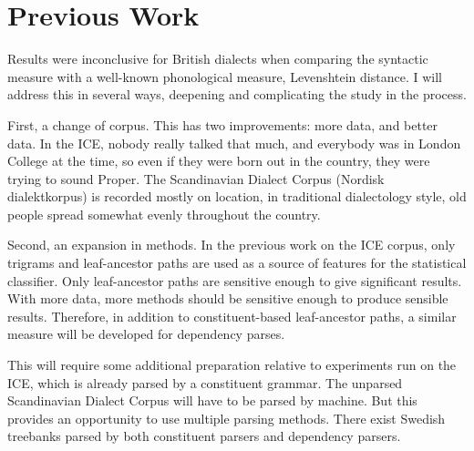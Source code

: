 \documentclass[11pt]{article}
\begin{document}
\section{Previous Work}

Results were inconclusive for British dialects when comparing the
syntactic measure with a well-known phonological measure, Levenshtein
distance. I will address this in several ways, deepening and
complicating the study in the process.

First, a change of corpus. This
has two improvements: more data, and better data. In the ICE, nobody
really talked that much, and everybody was in London College at the
time, so even if they were born out in the country, they were trying
to sound Proper. The Scandinavian Dialect Corpus
(Nordisk dialektkorpus) is recorded mostly on location, in traditional
dialectology style, old people spread somewhat evenly throughout the
country.

Second, an expansion in methods. In the previous work on the ICE
corpus, only trigrams and leaf-ancestor paths are used as a source of
features for the statistical classifier. Only leaf-ancestor paths are
sensitive enough to give significant results. With more data, more
methods should be sensitive enough to produce sensible
results. Therefore, in addition to constituent-based leaf-ancestor
paths, a similar measure will be developed for dependency parses.

This will require some additional preparation relative to experiments
run on the ICE, which is already parsed by a constituent grammar. The
unparsed Scandinavian Dialect Corpus will have to be parsed by
machine. But this provides an opportunity to use multiple parsing
methods. There exist Swedish treebanks parsed by both constituent parsers and
dependency parsers.
\end{document}
